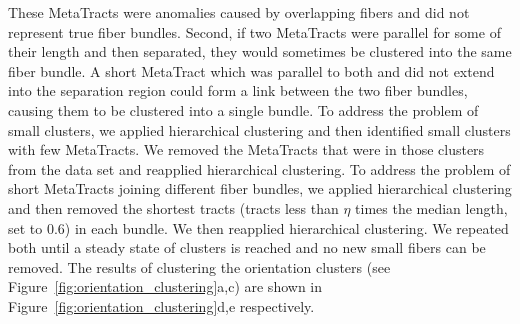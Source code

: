 These MetaTracts were anomalies caused by overlapping fibers and did not represent true fiber bundles.
Second, if two MetaTracts were parallel for some of their length and then separated, they would sometimes be clustered into the same fiber bundle.
A short MetaTract which was parallel to both and did not extend into the separation region could form a link between the two fiber bundles, causing them to be clustered into a single bundle.
To address the problem of small clusters, we applied hierarchical clustering and then identified small clusters with few MetaTracts.
We removed the MetaTracts that were in those clusters from the data set and reapplied hierarchical clustering.
To address the problem of short MetaTracts joining different fiber bundles, we applied hierarchical clustering and then removed the
shortest tracts (tracts less than $\eta$ times the median length, set to 0.6) in each bundle. We then reapplied hierarchical clustering.
We repeated both until a steady state of clusters is reached and no new small fibers can be removed. The results of clustering the orientation clusters (see Figure~\ref{fig:orientation_clustering}a,c) are shown in Figure~\ref{fig:orientation_clustering}d,e respectively. 

